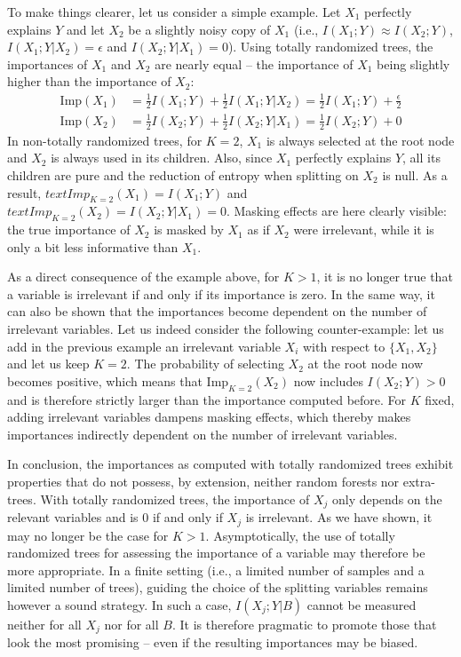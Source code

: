 To make things clearer, let us consider a simple example. Let $X_1$ perfectly explains $Y$
 and let $X_2$ be a slightly noisy copy of $X_1$ (i.e., $I(X_1;Y)
\approx I(X_2;Y)$, $I(X_1;Y|X_2)=\epsilon$ and $I(X_2;Y|X_1)=0$). Using totally
randomized trees, the importances of $X_1$ and $X_2$ are nearly equal -- the
importance of $X_1$ being slightly higher than the importance of $X_2$:
\begin{align}
\text{Imp}(X_1) &= \frac{1}{2} I(X_1;Y) + \frac{1}{2} I(X_1;Y|X_2) = \frac{1}{2} I(X_1;Y) + \frac{\epsilon}{2}\\
\text{Imp}(X_2) &= \frac{1}{2} I(X_2;Y) + \frac{1}{2} I(X_2;Y|X_1) = \frac{1}{2} I(X_2;Y) + 0
\end{align}
In non-totally randomized trees, for $K=2$, $X_1$ is always selected at the root
node and $X_2$ is always used in its children. Also, since $X_1$ perfectly
explains $Y$, all its children are pure and the reduction of entropy when
splitting on $X_2$ is null. As a result, $text{Imp}_{K=2}(X_1) = I(X_1;Y)$ and
$text{Imp}_{K=2}(X_2) = I(X_2;Y|X_1) = 0$. Masking effects are here
clearly visible: the true importance of $X_2$ is masked by $X_1$ as if $X_2$
were irrelevant, while it is only a bit less informative than $X_1$.

As a direct consequence of the example above, for $K>1$, it is no longer true
that a variable is irrelevant if and only if its importance is zero. In the same
way, it can also be shown that the importances become dependent on the number of
irrelevant variables. Let us indeed consider the following counter-example: let
us add in the previous example an irrelevant variable $X_i$ with respect to
$\{X_1, X_2\}$ and let us keep $K=2$. The probability of selecting $X_2$ at the
root node now becomes positive, which means that $\text{Imp}_{K=2}(X_2)$ now includes
$I(X_2;Y)>0$ and is therefore strictly larger than the importance computed
before. For $K$ fixed, adding irrelevant variables dampens masking effects,
which thereby makes importances indirectly dependent on the number of irrelevant
variables.

In conclusion, the importances as computed with totally randomized trees
exhibit properties that do not possess, by extension, neither random forests nor
extra-trees. With totally randomized trees, the importance of
$X_j$ only depends on the relevant variables and is 0 if and only if $X_j$ is
irrelevant. As we have shown, it may no longer be the case for $K>1$.
Asymptotically, the use of totally randomized trees for assessing the importance of
a variable may therefore be more appropriate. In a finite setting (i.e., a
limited number of samples and a limited number of trees), guiding the choice of
the splitting variables remains however a sound strategy. In such a case,
$I(X_j;Y|B)$ cannot be measured neither for all $X_j$ nor for all $B$. It is
therefore  pragmatic to promote those that look the most promising -- even if
the resulting importances may be biased.


